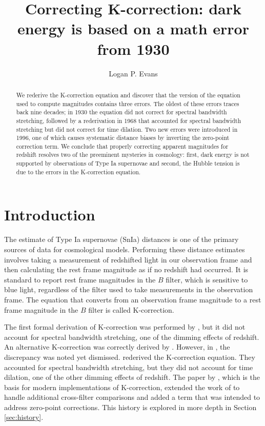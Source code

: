 \documentclass[linenumbers]{aastex631}
\begin{document}
\title{Correcting K-correction: dark energy is based on a math error from 1930}


\author[0000-0001-6450-3262]{Logan P. Evans}

\begin{abstract}
We rederive the K-correction equation and discover that the version of the
equation used to compute magnitudes contains three errors. The oldest of these
errors traces back nine decades; in 1930 the equation did not correct for
spectral bandwidth stretching, followed by a rederivation in 1968 that
accounted for spectral bandwidth stretching but did not correct for time
dilation. Two new errors were introduced in 1996, one of which causes
systematic distance biases by inverting the zero-point correction term. We
conclude that properly correcting apparent magnitudes for redshift resolves two
of the preeminent mysteries in cosmology: first, dark energy is not supported
by observations of Type Ia supernovae and second, the Hubble tension is due to
the errors in the K-correction equation.
\end{abstract}


\section{Introduction}

The estimate of Type Ia supernovae (SnIa) distances is one of the primary
sources of data for cosmological models. Performing these distance estimates
involves taking a measurement of redshifted light in our observation frame and
then calculating the rest frame magnitude as if no redshift had occurred. It is
standard to report rest frame magnitudes in the $B$ filter, which is sensitive to
blue light, regardless of the filter used to take measurements in the
observation frame. The equation that converts from an observation frame
magnitude to a rest frame magnitude in the $B$ filter is called K-correction.

The first formal derivation of K-correction was performed by
\citet{tolman1930}, but it did not account for spectral bandwidth stretching,
one of the dimming effects of redshift. An alternative K-correction was
correctly derived by \citet{desitter1934}. However, in \citet{hubble1935}, the
discrepancy was noted yet dismissed. \citet{oke1968} rederived the K-correction
equation.  They accounted for spectral bandwidth stretching, but they did not
account for time dilation, one of the other dimming effects of redshift. The
paper by \citet{kim1996}, which is the basis for modern implementations of
K-correction, extended the work of \citet{oke1968} to handle additional
cross-filter comparisons and added a term that was intended to address
zero-point corrections. This history is explored in more depth in Section
\ref{sec:history}.
\end{document}
